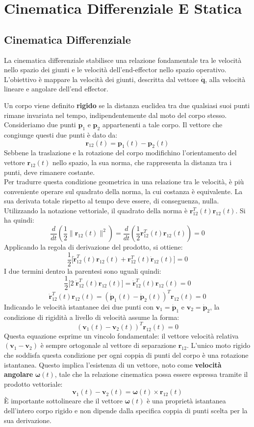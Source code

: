 \documentclass[11pt, a4paper]{report}
\begin{document}
\chapter{Cinematica Differenziale E Statica}
\section{Cinematica Differenziale}
La cinematica differenziale stabilisce una relazione fondamentale tra le velocità nello spazio dei giunti e le velocità dell'end-effector nello spazio operativo. L'obiettivo è mappare la velocità dei giunti, descritta dal vettore \(\dot{\bm{q}}\), alla velocità lineare e angolare dell'end effector.

Un corpo viene definito \textbf{rigido} se la distanza euclidea tra due qualsiasi suoi punti rimane invariata nel tempo, indipendentemente dal moto del corpo stesso. Consideriamo due punti \(\bm{p}_1\) e \(\bm{p}_2\) appartenenti a tale corpo. Il vettore che congiunge questi due punti è dato da:
\[
    \bm{r}_{12}(t) = \bm{p}_1(t) - \bm{p}_2(t)
\]
Sebbene la traslazione e la rotazione del corpo modifichino l'orientamento del vettore \(\bm{r}_{12}(t)\) nello spazio, la sua norma, che rappresenta la distanza tra i punti, deve rimanere costante.\\
Per tradurre questa condizione geometrica in una relazione tra le velocità, è più conveniente operare sul quadrato della norma, la cui costanza è equivalente. La sua derivata totale rispetto al tempo deve essere, di conseguenza, nulla. Utilizzando la notazione vettoriale, il quadrato della norma è \(\bm{r}_{12}^T(t) \bm{r}_{12}(t)\). Si ha quindi:
\[
    \frac{d}{dt} \left( \frac{1}{2} \| \bm{r}_{12}(t) \|^2 \right) = \frac{d}{dt} \left( \frac{1}{2} \bm{r}_{12}^T(t) \bm{r}_{12}(t) \right) = 0
\]
Applicando la regola di derivazione del prodotto, si ottiene:
\[
    \frac{1}{2} \biggl[ \dot{\bm{r}}_{12}^T(t) \bm{r}_{12}(t) + \bm{r}_{12}^T(t) \dot{\bm{r}}_{12}(t) \biggr] = 0
\]
I due termini dentro la parentesi sono uguali quindi:
\[
    \frac{1}{2} \biggl[ 2 \; \dot{\bm{r}}_{12}^T(t) \bm{r}_{12}(t) \biggr] = \dot{\bm{r}}_{12}^T(t) \bm{r}_{12}(t) = 0
\]
\[
    \dot{\bm{r}}_{12}^T(t) \bm{r}_{12}(t) = \left( \dot{\bm{p}}_1(t) - \dot{\bm{p}}_2(t) \right)^T \bm{r}_{12}(t) = 0
\]
Indicando le velocità istantanee dei due punti con \(\bm{v}_1 = \dot{\bm{p}}_1\) e \(\bm{v}_2 = \dot{\bm{p}}_2\), la condizione di rigidità a livello di velocità assume la forma:
\[
    \left( \bm{v}_1(t) - \bm{v}_2(t) \right)^T \bm{r}_{12}(t) = 0
\]
Questa equazione esprime un vincolo fondamentale: il vettore velocità relativa \((\bm{v}_1 - \bm{v}_2)\) è sempre ortogonale al vettore di separazione \(\bm{r}_{12}\). L'unico moto rigido che soddisfa questa condizione per ogni coppia di punti del corpo è una rotazione istantanea. Questo implica l'esistenza di un vettore, noto come \textbf{velocità angolare} \(\bm{\omega}(t)\), tale che la relazione cinematica possa essere espressa tramite il prodotto vettoriale:
\[
    \bm{v}_1(t) - \bm{v}_2(t) = \bm{\omega}(t) \times \bm{r}_{12}(t)
\]
È importante sottolineare che il vettore \(\bm{\omega}(t)\) è una proprietà istantanea dell'intero corpo rigido e non dipende dalla specifica coppia di punti scelta per la sua derivazione.
\end{document}
